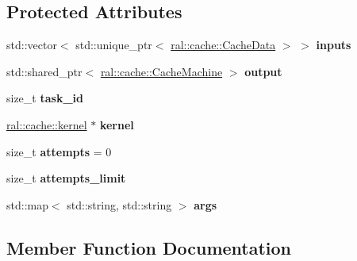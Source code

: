 \subsection*{Protected Attributes}
\begin{DoxyCompactItemize}
\item 
\mbox{\label{classral_1_1execution_1_1task_a30865550f3312875d234c37938e16d52}} 
std\+::vector$<$ std\+::unique\+\_\+ptr$<$ \hyperlink{classral_1_1cache_1_1CacheData}{ral\+::cache\+::\+Cache\+Data} $>$ $>$ {\bfseries inputs}
\item 
\mbox{\label{classral_1_1execution_1_1task_a69b46153c6ae2aee16c767ead2f67c4a}} 
std\+::shared\+\_\+ptr$<$ \hyperlink{classral_1_1cache_1_1CacheMachine}{ral\+::cache\+::\+Cache\+Machine} $>$ {\bfseries output}
\item 
\mbox{\label{classral_1_1execution_1_1task_ab215212c02873b4435a002619c512de4}} 
size\+\_\+t {\bfseries task\+\_\+id}
\item 
\mbox{\label{classral_1_1execution_1_1task_a994c38701c3461b9b1c51058c87952f0}} 
\hyperlink{classral_1_1cache_1_1kernel}{ral\+::cache\+::kernel} $\ast$ {\bfseries kernel}
\item 
\mbox{\label{classral_1_1execution_1_1task_adc16ddbbeb544104e23f4f1acbed6d06}} 
size\+\_\+t {\bfseries attempts} = 0
\item 
\mbox{\label{classral_1_1execution_1_1task_a2155c914c1ff875fe6be20d2248e3899}} 
size\+\_\+t {\bfseries attempts\+\_\+limit}
\item 
\mbox{\label{classral_1_1execution_1_1task_a1023c8598988094cda50cb63145b8912}} 
std\+::map$<$ std\+::string, std\+::string $>$ {\bfseries args}
\end{DoxyCompactItemize}


\subsection{Member Function Documentation}
\mbox{\label{classral_1_1execution_1_1task_a6b0526afb984d7f2e7fb83fd7c1913ec}} 
